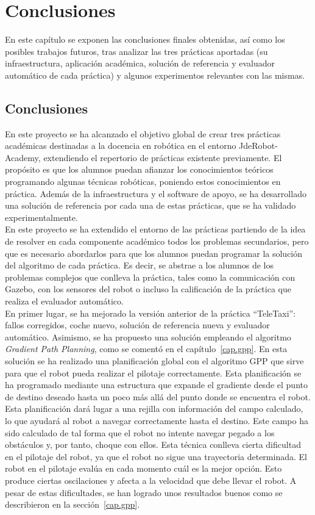 \chapter{Conclusiones}\label{cap.conclusiones}
En este capítulo se exponen las conclusiones finales obtenidas, así como los posibles trabajos futuros, tras analizar las tres prácticas aportadas (su infraestructura, aplicación académica, solución de referencia y evaluador automático de cada práctica) y algunos experimentos relevantes con las mismas.

\section{Conclusiones}
En este proyecto se ha alcanzado el objetivo global de crear tres prácticas académicas destinadas a la docencia en robótica en el entorno JdeRobot-Academy, extendiendo el repertorio de prácticas existente previamente. El propósito es que los alumnos puedan afianzar los conocimientos teóricos programando algunas técnicas robóticas, poniendo estos conocimientos en práctica. Además de la infraestructura y el software de apoyo, se ha desarrollado una solución de referencia por cada una de estas prácticas, que se ha validado experimentalmente.\\

En este proyecto se ha extendido el entorno de las prácticas partiendo de la idea de resolver en cada componente académico todos los problemas secundarios, pero que es necesario abordarlos para que los alumnos puedan programar la solución del algoritmo de cada práctica. Es decir, se abstrae a los alumnos de los problemas complejos que conlleva la práctica, tales como la comunicación con Gazebo, con los sensores del robot o incluso la calificación de la práctica que realiza el evaluador automático.\\

En primer lugar, se ha mejorado la versión anterior de la práctica ``TeleTaxi'': fallos corregidos, coche nuevo, solución de referencia nueva y evaluador automático. Asimismo, se ha propuesto una solución empleando el algoritmo \textit{Gradient Path Planning}, como se comentó en el capítulo~\ref{cap.gpp}. En esta solución se ha realizado una planificación global con el algoritmo GPP que sirve para que el robot pueda realizar el pilotaje correctamente. Esta planificación se ha programado mediante una estructura que expande el gradiente desde el punto de destino deseado hasta un poco más allá del punto donde se encuentra el robot. Esta planificación dará lugar a una rejilla con información del campo calculado, lo que ayudará al robot a navegar correctamente hasta el destino. Este campo ha sido calculado de tal forma que el robot no intente navegar pegado a los obstáculos y, por tanto, choque con ellos. Esta técnica conlleva cierta dificultad en el pilotaje del robot, ya que el robot no sigue una trayectoria determinada. El robot en el pilotaje evalúa en cada momento cuál es la mejor opción. Esto produce ciertas oscilaciones y afecta a la velocidad que debe llevar el robot. A pesar de estas dificultades, se han logrado unos resultados buenos como se describieron en la sección~\ref{cap.gpp}. \\

